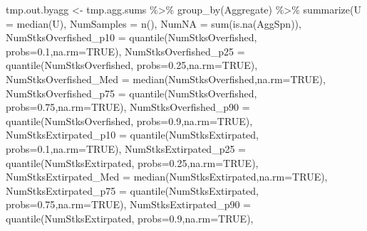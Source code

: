 \documentclass[french,11pt]{book}
\newenvironment{Shaded}{\begin{snugshade}}{\end{snugshade}}
\newcommand{\AttributeTok}[1]{\textcolor[rgb]{0.77,0.63,0.00}{#1}}
\newcommand{\ConstantTok}[1]{\textcolor[rgb]{0.00,0.00,0.00}{#1}}
\newcommand{\FloatTok}[1]{\textcolor[rgb]{0.00,0.00,0.81}{#1}}
\newcommand{\FunctionTok}[1]{\textcolor[rgb]{0.00,0.00,0.00}{#1}}
\newcommand{\NormalTok}[1]{#1}
\newcommand{\OtherTok}[1]{\textcolor[rgb]{0.56,0.35,0.01}{#1}}
\newcommand{\SpecialCharTok}[1]{\textcolor[rgb]{0.00,0.00,0.00}{#1}}
\begin{document}
\begin{Shaded}
\begin{Highlighting}[]
\NormalTok{  tmp.out.byagg }\OtherTok{\textless{}{-}}\NormalTok{ tmp.agg.sums }\SpecialCharTok{\%\textgreater{}\%} \FunctionTok{group\_by}\NormalTok{(Aggregate) }\SpecialCharTok{\%\textgreater{}\%}
    \FunctionTok{summarize}\NormalTok{(}\AttributeTok{U =} \FunctionTok{median}\NormalTok{(U),}
              \AttributeTok{NumSamples =}  \FunctionTok{n}\NormalTok{(),}
              \AttributeTok{NumNA =} \FunctionTok{sum}\NormalTok{(}\FunctionTok{is.na}\NormalTok{(AggSpn)),}
              \AttributeTok{NumStksOverfished\_p10 =} \FunctionTok{quantile}\NormalTok{(NumStksOverfished,}
                       \AttributeTok{probs=}\FloatTok{0.1}\NormalTok{,}\AttributeTok{na.rm=}\ConstantTok{TRUE}\NormalTok{),}
              \AttributeTok{NumStksOverfished\_p25 =} \FunctionTok{quantile}\NormalTok{(NumStksOverfished,}
                       \AttributeTok{probs=}\FloatTok{0.25}\NormalTok{,}\AttributeTok{na.rm=}\ConstantTok{TRUE}\NormalTok{),}
              \AttributeTok{NumStksOverfished\_Med =} \FunctionTok{median}\NormalTok{(NumStksOverfished,}\AttributeTok{na.rm=}\ConstantTok{TRUE}\NormalTok{),}
              \AttributeTok{NumStksOverfished\_p75 =} \FunctionTok{quantile}\NormalTok{(NumStksOverfished,}
                       \AttributeTok{probs=}\FloatTok{0.75}\NormalTok{,}\AttributeTok{na.rm=}\ConstantTok{TRUE}\NormalTok{),}
              \AttributeTok{NumStksOverfished\_p90 =} \FunctionTok{quantile}\NormalTok{(NumStksOverfished,}
                       \AttributeTok{probs=}\FloatTok{0.9}\NormalTok{,}\AttributeTok{na.rm=}\ConstantTok{TRUE}\NormalTok{),}
              \AttributeTok{NumStksExtirpated\_p10 =} \FunctionTok{quantile}\NormalTok{(NumStksExtirpated,}
                       \AttributeTok{probs=}\FloatTok{0.1}\NormalTok{,}\AttributeTok{na.rm=}\ConstantTok{TRUE}\NormalTok{),}
              \AttributeTok{NumStksExtirpated\_p25 =} \FunctionTok{quantile}\NormalTok{(NumStksExtirpated,}
                        \AttributeTok{probs=}\FloatTok{0.25}\NormalTok{,}\AttributeTok{na.rm=}\ConstantTok{TRUE}\NormalTok{),}
              \AttributeTok{NumStksExtirpated\_Med =} \FunctionTok{median}\NormalTok{(NumStksExtirpated,}\AttributeTok{na.rm=}\ConstantTok{TRUE}\NormalTok{),}
              \AttributeTok{NumStksExtirpated\_p75 =} \FunctionTok{quantile}\NormalTok{(NumStksExtirpated,}
                       \AttributeTok{probs=}\FloatTok{0.75}\NormalTok{,}\AttributeTok{na.rm=}\ConstantTok{TRUE}\NormalTok{),}
              \AttributeTok{NumStksExtirpated\_p90 =} \FunctionTok{quantile}\NormalTok{(NumStksExtirpated,}
                       \AttributeTok{probs=}\FloatTok{0.9}\NormalTok{,}\AttributeTok{na.rm=}\ConstantTok{TRUE}\NormalTok{),}

\end{Highlighting}
\end{Shaded}
\end{document}
